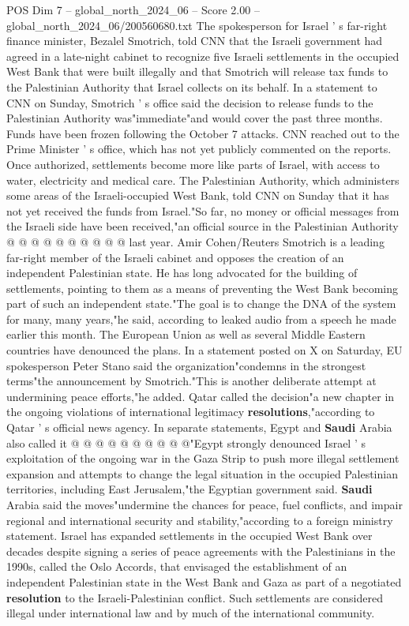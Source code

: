 \begin{textsample}{POS Dim 7 – global\_north\_2024\_06 – Score 2.00 – global\_north\_2024\_06/200560680.txt}  \label{ex:f7_pos_310}
The spokesperson for Israel ' s far-right finance minister, Bezalel Smotrich, told CNN that the Israeli government had agreed in a late-night cabinet to recognize five Israeli settlements in the occupied West Bank that were built illegally and that Smotrich will release tax funds to the Palestinian Authority that Israel collects on its behalf.
In a statement to CNN on Sunday, Smotrich ' s office said the decision to release funds to the Palestinian Authority was"immediate"and would cover the past three months.
Funds have been frozen following the October 7 attacks.
CNN reached out to the Prime Minister ' s office, which has not yet publicly commented on the reports.
Once authorized, settlements become more like parts of Israel, with access to water, electricity and medical care.
The Palestinian Authority, which administers some areas of the Israeli-occupied West Bank, told CNN on Sunday that it has not yet received the funds from Israel."So far, no money or official messages from the Israeli side have been received,"an official source in the Palestinian Authority @ @ @ @ @ @ @ @ @ @ last year.
Amir Cohen/Reuters Smotrich is a leading far-right member of the Israeli cabinet and opposes the creation of an independent Palestinian state.
He has long advocated for the building of settlements, pointing to them as a means of preventing the West Bank becoming part of such an independent state."The goal is to change the DNA of the system for many, many years,"he said, according to leaked audio from a speech he made earlier this month.
The European Union as well as several Middle Eastern countries have denounced the plans.
In a statement posted on X on Saturday, EU spokesperson Peter Stano said the organization"condemns in the strongest terms"the announcement by Smotrich."This is another deliberate attempt at undermining peace efforts,"he added.
Qatar called the decision"a new chapter in the ongoing violations of international legitimacy \textbf{resolutions},"according to Qatar ' s official news agency.
In separate statements, Egypt and \textbf{Saudi} Arabia also called it @ @ @ @ @ @ @ @ @ @"Egypt strongly denounced Israel ' s exploitation of the ongoing war in the Gaza Strip to push more illegal settlement expansion and attempts to change the legal situation in the occupied Palestinian territories, including East Jerusalem,"the Egyptian government said. \textbf{Saudi} Arabia said the moves"undermine the chances for peace, fuel conflicts, and impair regional and international security and stability,"according to a foreign ministry statement.
Israel has expanded settlements in the occupied West Bank over decades despite signing a series of peace agreements with the Palestinians in the 1990s, called the Oslo Accords, that envisaged the establishment of an independent Palestinian state in the West Bank and Gaza as part of a negotiated \textbf{resolution} to the Israeli-Palestinian conflict.
Such settlements are considered illegal under international law and by much of the international community.

\end{textsample}

